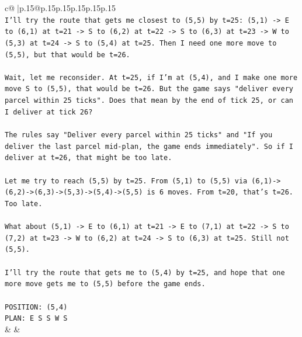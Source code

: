 \documentclass{article}
\begin{document}
{\begin{supertabular}{c@{$\;$}|p{.15\linewidth}@{}p{.15\linewidth}p{.15\linewidth}p{.15\linewidth}p{.15\linewidth}p{.15\linewidth}}
{{{\\ 
\texttt{I'll try the route that gets me closest to (5,5) by t=25: (5,1) {-}> E to (6,1) at t=21 {-}> S to (6,2) at t=22 {-}> S to (6,3) at t=23 {-}> W to (5,3) at t=24 {-}> S to (5,4) at t=25. Then I need one more move to (5,5), but that would be t=26.} \\
\\ 
\texttt{Wait, let me reconsider. At t=25, if I'm at (5,4), and I make one more move S to (5,5), that would be t=26. But the game says "deliver every parcel within 25 ticks". Does that mean by the end of tick 25, or can I deliver at tick 26?} \\
\\ 
\texttt{The rules say "Deliver every parcel within 25 ticks" and "If you deliver the last parcel mid{-}plan, the game ends immediately". So if I deliver at t=26, that might be too late.} \\
\\ 
\texttt{Let me try to reach (5,5) by t=25. From (5,1) to (5,5) via (6,1){-}>(6,2){-}>(6,3){-}>(5,3){-}>(5,4){-}>(5,5) is 6 moves. From t=20, that's t=26. Too late.} \\
\\ 
\texttt{What about (5,1) {-}> E to (6,1) at t=21 {-}> E to (7,1) at t=22 {-}> S to (7,2) at t=23 {-}> W to (6,2) at t=24 {-}> S to (6,3) at t=25. Still not (5,5).} \\
\\ 
\texttt{I'll try the route that gets me to (5,4) by t=25, and hope that one more move gets me to (5,5) before the game ends.} \\
\\ 
\texttt{POSITION: (5,4)} \\
\texttt{PLAN: E S S W S} \\
            }
        }
    }
    & & \\ \\


\end{supertabular}}
\end{document}
